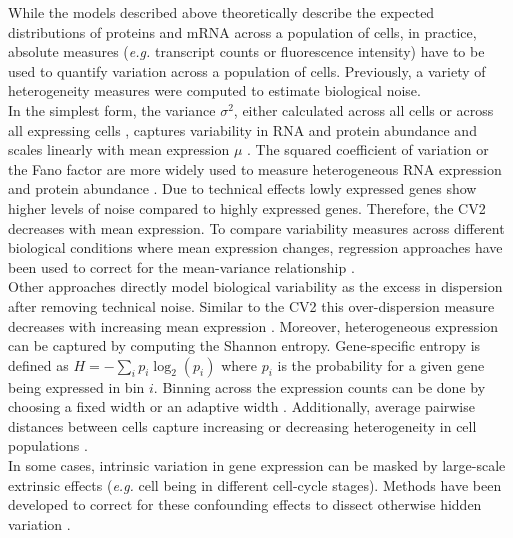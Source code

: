 While the models described above theoretically describe the expected distributions of proteins and mRNA across a population of cells, in practice, absolute measures (\emph{e.g.} transcript counts or fluorescence intensity) have to be used to quantify variation across a population of cells. Previously, a variety of heterogeneity measures were computed to estimate biological noise. \\
In the simplest form, the variance $\sigma^2$, either calculated across all cells or across all expressing cells \citep{Shalek2014}, captures variability in RNA and protein abundance and scales linearly with mean expression $\mu$ \citep{Dey2015a}. The squared coefficient of variation or the Fano factor are more widely used to measure heterogeneous RNA expression \citep{Brennecke2013, Jones2014} and protein abundance \citep{Newman2006}. Due to technical effects \citep{Brennecke2013} lowly expressed genes show higher levels of noise compared to highly expressed genes. Therefore, the CV2 decreases with mean expression. To compare variability measures across different biological conditions where mean expression changes, regression approaches have been used to correct for the mean-variance relationship \citep{Kolodziejczyk2015cell, Fan2016}. \\ 
Other approaches directly model biological variability as the excess in dispersion after removing technical noise. Similar to the CV2 this over-dispersion measure decreases with increasing mean expression \citep{Vallejos2015BASiCS}. Moreover, heterogeneous expression can be captured by computing the Shannon entropy. Gene-specific entropy is defined as $H=-\sum_i{}p_i\log_2(p_i)$ where $p_i$ is the probability for a given gene being expressed in bin $i$. Binning across the expression counts can be done by choosing a fixed width \citep{Richard2016} or an adaptive width \citep{Stumpf2017}. Additionally, average pairwise distances between cells capture increasing or decreasing heterogeneity in cell populations \citep{Mohammed2017}. \\ 
In some cases, intrinsic variation in gene expression can be masked by large-scale extrinsic effects (\emph{e.g.} cell being in different cell-cycle stages). Methods have been developed to correct for these confounding effects to dissect otherwise hidden variation \citep{Buettner2015, Buettner2017}. 
